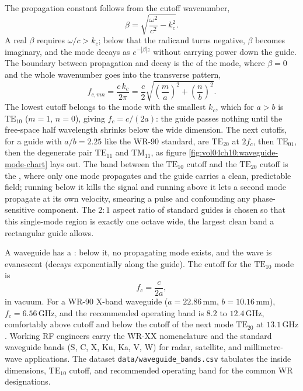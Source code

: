 The propagation constant follows from the cutoff wavenumber,
\[
\beta = \sqrt{\frac{\omega^2}{c^2} - k_c^2}.
\]
A real $\beta$ requires $\omega/c > k_c$; below that the radicand turns
negative, $\beta$ becomes imaginary, and the mode decays as $e^{-|\beta|
z}$ without carrying power down the guide. The boundary between
propagation and decay is the  of the mode,
where $\beta = 0$ and the whole wavenumber goes into the transverse
pattern,
\[
f_{c,mn} = \frac{c\,k_c}{2\pi} = \frac{c}{2}\sqrt{\left(\frac{m}{a}
\right)^2 + \left(\frac{n}{b}\right)^2}.
\]
The lowest cutoff belongs to the mode with the smallest $k_c$, which for
$a>b$ is $\text{TE}_{10}$ ($m=1$, $n=0$), giving $f_c = c/(2a)$: the
guide passes nothing until the free-space half wavelength shrinks below
the wide dimension. The next cutoffs, for a guide with $a/b = 2.25$ like
the WR-90 standard, are $\text{TE}_{20}$ at $2f_c$, then $\text{TE}_{01}$,
then the degenerate pair $\text{TE}_{11}$ and $\text{TM}_{11}$, as figure
\ref{fig:vol04ch10:waveguide-mode-chart} lays out. The band between the
$\text{TE}_{10}$ cutoff and the $\text{TE}_{20}$ cutoff is the
, where only one mode propagates and the
guide carries a clean, predictable field; running below it kills the
signal and running above it lets a second mode propagate at its own
velocity, smearing a pulse and confounding any phase-sensitive component.
The $2{:}1$ aspect ratio of standard guides is chosen so that this
single-mode region is exactly one octave wide, the largest clean band a
rectangular guide allows.



A waveguide has a : below it, no propagating
mode exists, and the wave is evanescent (decays exponentially along
the guide). The cutoff for the $\text{TE}_{10}$ mode is
\[
f_{c} = \frac{c}{2a},
\]
in vacuum. For a WR-90 X-band waveguide ($a = 22.86\,\si{\milli
\meter}$, $b = 10.16\,\si{\milli\meter}$), $f_{c} = 6.56\,\si{\giga
\hertz}$, and the recommended operating band is $8.2$ to $12.4\,\si{
\giga\hertz}$, comfortably above cutoff and below the cutoff of the
next mode $\text{TE}_{20}$ at $13.1\,\si{\giga\hertz}$. Working RF
engineers carry the WR-XX nomenclature and the standard waveguide
bands (S, C, X, Ku, Ka, V, W) for radar, satellite, and millimetre-
wave applications. The dataset \texttt{data/waveguide\_bands.csv}
tabulates the inside dimensions, $\text{TE}_{10}$ cutoff, and
recommended operating band for the common WR designations.


